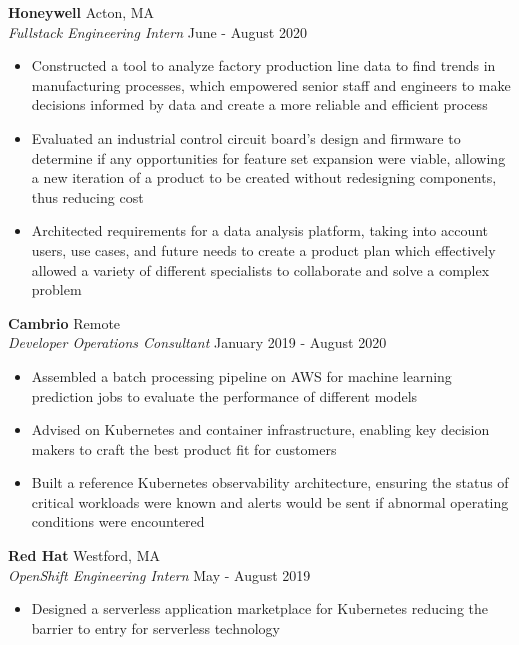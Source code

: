 \documentclass[10pt]{article}
\begin{document}
\begin{flushleft}
	\textbf{Honeywell} \hfill Acton, MA \\
	\textit{Fullstack Engineering Intern} \hfill June - August 2020 \\
    \begin{itemize}
        \item Constructed a tool to analyze factory production line data to find trends in manufacturing processes, which empowered senior staff and engineers to make decisions informed by data and create a more reliable and efficient process

		\item Evaluated an industrial control circuit board's design and firmware to determine if any opportunities for feature set expansion were viable, allowing a new iteration of a product to be created without redesigning components, thus reducing cost

		\item Architected requirements for a data analysis platform, taking into account users, use cases, and future needs to create a product plan which effectively allowed a variety of different specialists to collaborate and solve a complex problem
    \end{itemize}

	\textbf{Cambrio} \hfill Remote \\
	\textit{Developer Operations Consultant} \hfill January 2019 - August 2020  \\
	\begin{itemize}
		\item Assembled a batch processing pipeline on AWS for machine learning prediction jobs to evaluate the performance of different models
		\item Advised on Kubernetes and container infrastructure, enabling key decision makers to craft the best product fit for customers
		\item Built a reference Kubernetes observability architecture, ensuring the status of critical workloads were known and alerts would be sent if abnormal operating conditions were encountered
	\end{itemize}

    
	\textbf{Red Hat} \hfill Westford, MA \\
	\textit{OpenShift Engineering Intern} \hfill May - August 2019 \\
	\begin{itemize}
        \item Designed a serverless application marketplace for Kubernetes reducing the barrier to entry for serverless technology
        

\end{itemize}
\end{flushleft}
\end{document}
